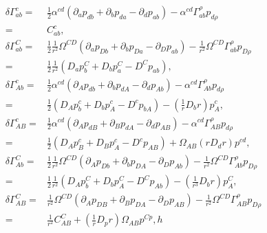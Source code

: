 \documentclass[12pt]{report}
\begin{document}
\begin{align}
    \delta\Gamma^c_{ab}
    =&
    \frac{1}{2}\alpha^{cd}
    \left(
        \partial_ap_{db}
        +
        \partial_bp_{da}
        -
        \partial_dp_{ab}
    \right)
    -
    \alpha^{cd}\Gamma^{\rho}_{ab}p_{d\rho}
    \nonumber\\
    =&
    C^c_{ab}
    ,\\
    \delta\Gamma^C_{ab}
    =&
    \frac{1}{2}\frac{1}{r^2}\Omega^{CD}
    \left(
        \partial_ap_{Db}
        +
        \partial_bp_{Da}
        -
        \partial_Dp_{ab}
    \right)
    -
    \frac{1}{r^2}\Omega^{CD}\Gamma^{\rho}_{ab}p_{D\rho}
    \nonumber\\
    =&
    \frac{1}{2}\frac{1}{r^2}
    \left(
        D_ap^C_b
        +
        D_bp^C_a
        -
        D^Cp_{ab}
    \right)
    ,\\
    \delta\Gamma^c_{Ab}
    =&
    \frac{1}{2}\alpha^{cd}
    \left(
        \partial_Ap_{db}
        +
        \partial_bp_{dA}
        -
        \partial_dp_{Ab}
    \right)
    -
    \alpha^{cd}\Gamma^{\rho}_{Ab}p_{d\rho}
    \nonumber \\
    =&
    \frac{1}{2}
    \left(
        D_Ap^c_b
        +
        D_bp^c_A
        -
        D^cp_{bA}
    \right)
    -
    \left(\frac{1}{r}D_br\right) p^c_A
    ,\\
    \delta\Gamma^c_{AB}
    =&
    \frac{1}{2}\alpha^{cd}
    \left(
        \partial_Ap_{dB}
        +
        \partial_Bp_{dA}
        -
        \partial_dp_{AB}
    \right)
    -
    \alpha^{cd}\Gamma^{\rho}_{AB}p_{d\rho}
    \nonumber\\
    =&
    \frac{1}{2}
    \left(
        D_Ap^c_B
        +
        D_Bp^c_A
        -
        D^cp_{AB}
    \right)
    +
    \Omega_{AB}\left(rD_dr\right)p^{cd}
    ,\\
    \delta\Gamma^C_{Ab}
    =&
    \frac{1}{2}\frac{1}{r^2}\Omega^{CD}
    \left(
        \partial_Ap_{Db}
        +
        \partial_bp_{DA}
        -
        \partial_Dp_{Ab}
    \right)
    -
    \frac{1}{r^2}\Omega^{CD}\Gamma^{\rho}_{Ab}p_{D\rho}
    \nonumber\\
    =&
    \frac{1}{2}\frac{1}{r^2}
    \left(
        D_Ap^C_b
        +
        D_bp^C_A
        -
        D^Cp_{Ab}
    \right)
    -
    \left(\frac{1}{r^3}D_br\right)p^C_A
    ,\\
    \delta\Gamma^C_{AB}
    =&
    \frac{1}{r^2}\Omega^{CD}
    \left(
        \partial_Ap_{DB}
        +
        \partial_Bp_{DA}
        -
        \partial_Dp_{AB}
    \right)
    -
    \frac{1}{r^2}\Omega^{CD}\Gamma^{\rho}_{AB}p_{D\rho}
    \nonumber\\
    =&
    \frac{1}{r^2}C^C_{AB}
    +
    \left(\frac{1}{r}D_pr\right)\Omega_{AB}p^{Cp}
    ,
h\end{align}
\end{document}
